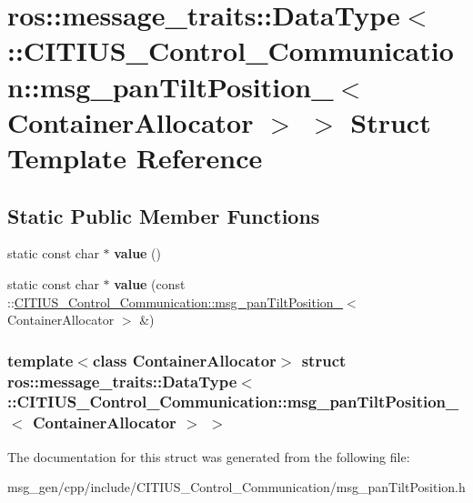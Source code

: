 \hypertarget{structros_1_1message__traits_1_1_data_type_3_01_1_1_c_i_t_i_u_s___control___communication_1_1msgdd236e1e11f95e9aabd8a6392f595598}{\section{ros\-:\-:message\-\_\-traits\-:\-:\-Data\-Type$<$ \-:\-:\-C\-I\-T\-I\-U\-S\-\_\-\-Control\-\_\-\-Communication\-:\-:msg\-\_\-pan\-Tilt\-Position\-\_\-$<$ \-Container\-Allocator $>$ $>$ \-Struct \-Template \-Reference}
\label{structros_1_1message__traits_1_1_data_type_3_01_1_1_c_i_t_i_u_s___control___communication_1_1msgdd236e1e11f95e9aabd8a6392f595598}
}
\subsection*{\-Static \-Public \-Member \-Functions}
\begin{DoxyCompactItemize}
\item 
\hypertarget{structros_1_1message__traits_1_1_data_type_3_01_1_1_c_i_t_i_u_s___control___communication_1_1msgdd236e1e11f95e9aabd8a6392f595598_af2caf257e0c83e69c1a8dc41d8f0056d}{static const char $\ast$ {\bfseries value} ()}\label{structros_1_1message__traits_1_1_data_type_3_01_1_1_c_i_t_i_u_s___control___communication_1_1msgdd236e1e11f95e9aabd8a6392f595598_af2caf257e0c83e69c1a8dc41d8f0056d}

\item 
\hypertarget{structros_1_1message__traits_1_1_data_type_3_01_1_1_c_i_t_i_u_s___control___communication_1_1msgdd236e1e11f95e9aabd8a6392f595598_a131daaadbe9cab2d38cdad8b551be1a7}{static const char $\ast$ {\bfseries value} (const \-::\hyperlink{struct_c_i_t_i_u_s___control___communication_1_1msg__pan_tilt_position__}{\-C\-I\-T\-I\-U\-S\-\_\-\-Control\-\_\-\-Communication\-::msg\-\_\-pan\-Tilt\-Position\-\_\-}$<$ \-Container\-Allocator $>$ \&)}\label{structros_1_1message__traits_1_1_data_type_3_01_1_1_c_i_t_i_u_s___control___communication_1_1msgdd236e1e11f95e9aabd8a6392f595598_a131daaadbe9cab2d38cdad8b551be1a7}

\end{DoxyCompactItemize}
\subsubsection*{template$<$class Container\-Allocator$>$ struct ros\-::message\-\_\-traits\-::\-Data\-Type$<$ \-::\-C\-I\-T\-I\-U\-S\-\_\-\-Control\-\_\-\-Communication\-::msg\-\_\-pan\-Tilt\-Position\-\_\-$<$ Container\-Allocator $>$ $>$}



\-The documentation for this struct was generated from the following file\-:\begin{DoxyCompactItemize}
\item 
msg\-\_\-gen/cpp/include/\-C\-I\-T\-I\-U\-S\-\_\-\-Control\-\_\-\-Communication/msg\-\_\-pan\-Tilt\-Position.\-h\end{DoxyCompactItemize}
